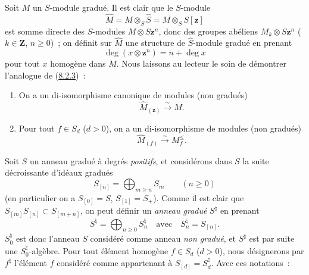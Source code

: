 \begin{env}[8.2.4]
\label{II.8.2.4-fr}
Soit $M$ un $S$-module gradué. Il est clair que le $S$-module
\begin{equation}
\label{II.8.2.4.1-fr}
  \widehat{M}=M\otimes_S\widehat{S}=M\otimes_S S[\mathbf{z}]
\tag{8.2.4.1}
\end{equation}
est somme directe des $S$-modules $M\otimes S\mathbf{z}^n$, donc des groupes abéliens
$M_k\otimes S\mathbf{z}^n$ ($k\in\mathbf{Z}$, $n\geq0$)~; on définit sur
$\widehat{M}$ une structure de $\widehat{S}$-module gradué en prenant
\begin{equation}
\label{II.8.2.4.2-fr}
  \deg(x\otimes\mathbf{z}^n)=n+\deg x
\tag{8.2.4.2}
\end{equation}
pour tout $x$ homogène dans $M$. Nous laissons au lecteur le soin de démontrer
l'analogue de (\hyperref[II.8.2.3-fr]{8.2.3})~:
\end{env}

\begin{lemma}[8.2.5]
\label{II.8.2.5-fr}
\begin{enumerate}
\item[\rm(i)] On a un di-isomorphisme canonique de modules (non gradués)
\begin{equation}
\label{II.8.2.5.1-fr}
  \widehat{M}_{(\mathbf{z})}\xrightarrow{\sim}M.
\tag{8.2.5.1}
\end{equation}
\item[\rm(ii)] Pour tout $f\in S_d$ ($d>0$), on a un di-isomorphisme de
modules (non gradués)
\begin{equation}
\label{II.8.2.5.2-fr}
  \widehat{M}_{(f)}\xrightarrow{\sim}M_f^{\leq}.
\tag{8.2.5.2}
\end{equation}
\end{enumerate}
\end{lemma}

\begin{env}[8.2.6]
\label{II.8.2.6-fr}
Soit $S$ un anneau gradué à degrés \emph{positifs}, et considérons dans $S$
la suite décroissante d'idéaux gradués
\begin{equation}
\label{II.8.2.6.1-fr}
  S_{[n]}=\bigoplus_{m\geq n}S_m\qquad(n\geq0)
\tag{8.2.6.1}
\end{equation}
(en particulier on a $S_{[0]}=S$, $S_{[1]}=S_+$). Comme il est clair que
$S_{[m]}S_{[n]}\subset S_{[m+n]}$, on peut définir un \emph{anneau gradué}
$S^\natural$ en prenant
\begin{equation}
\label{II.8.2.6.2-fr}
  S^\natural=\bigoplus_{n\geq0}S_n^\natural
  \quad\text{avec}\quad S_n^\natural=S_{[n]}.
\tag{8.2.6.2}
\end{equation}
$S_0^\natural$ est donc l'anneau $S$ considéré comme anneau \emph{non gradué},
et $S^\natural$ est par suite une $S_0^\natural$-algèbre. Pour tout élément
homogène $f\in S_d$ ($d>0$), nous désignerons par $f^\natural$ l'élément
$f$ considéré comme appartenant à $S_{[d]}=S_d^\natural$. Avec ces
notations~:
\end{env}


